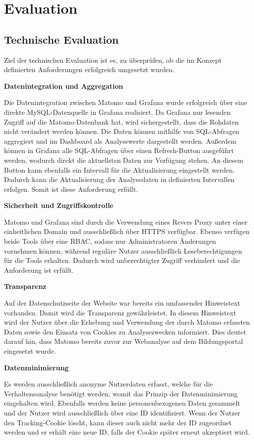 \chapter{Evaluation}
\label{ch:evaluation}

\section{Technische Evaluation}
\label{sec:technische-evaluation}
Ziel der technischen Evaluation ist es, zu überprüfen, ob die im Konzept definierten Anforderungen erfolgreich umgesetzt wurden.

\textbf{Datenintegration und Aggregation}

Die Datenintegration zwischen Matomo und Grafana wurde erfolgreich über eine direkte MySQL-Datenquelle in Grafana realisiert. Da Grafana nur lesenden Zugriff auf die Matomo-Datenbank hat, wird sichergestellt, dass die Rohdaten nicht verändert werden können. Die Daten können mithilfe von SQL-Abfragen aggregiert und im Dashboard als Analysewerte dargestellt werden. Außerdem können in Grafana alle SQL-Abfragen über einen Refresh-Button ausgeführt werden, wodurch direkt die aktuellsten Daten zur Verfügung stehen. An diesem Button kann ebenfalls ein Intervall für die Aktualisierung eingestellt werden. Dadurch kann die Aktualisierung der Analysedaten in definierten Intervallen erfolgen. Somit ist diese Anforderung erfüllt.

\textbf{Sicherheit und Zugriffskontrolle}

Matomo und Grafana sind durch die Verwendung eines Revers Proxy unter einer einheitlichen Domain und ausschließlich über HTTPS verfügbar. Ebenso verfügen beide Tools über eine RBAC, sodass nur Administratoren Änderungen vornehmen können, während reguläre Nutzer ausschließlich Leseberechtigungen für die Tools erhalten. Dadurch wird unberechtigter Zugriff verhindert und die Anforderung ist erfüllt. 

\textbf{Transparenz}

Auf der Datenschutzseite der Website war bereits ein umfassender Hinweistext vorhanden. Damit wird die Transparenz gewährleistet. In diesem Hinweistext wird der Nutzer über die Erhebung und Verwendung der durch Matomo erfassten Daten sowie den Einsatz von Cookies zu Analysezwecken informiert. Dies deutet darauf hin, dass Matomo bereits zuvor zur Webanalyse auf dem Bildungsportal eingesetzt wurde. 

\textbf{Datenminimierung}

Es werden ausschließlich anonyme Nutzerdaten erfasst, welche für die Verhaltensanalyse benötigt werden, womit das Prinzip der Datenminimierung eingehalten wird. Ebenfalls werden keine personenbezogenen Daten gesammelt und der Nutzer wird ausschließlich über eine ID identifiziert. Wenn der Nutzer den Tracking-Cookie löscht, kann dieser auch nicht mehr der ID zugeordnet werden und er erhält eine neue ID, falls der Cookie später erneut akzeptiert wird.

